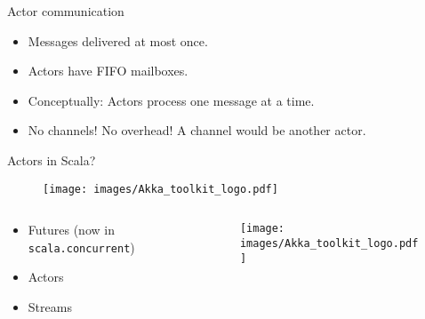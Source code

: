 \documentclass[aspectratio=169]{beamer}
\newcommand{\megatext}[1]{
  \begin{center}
    \Huge
    #1
  \end{center}
}
\begin{document}
\begin{frame}{Actor communication}
  \begin{figure}
  \end{figure}

  \begin{itemize}
  \item Messages delivered at most once.
  \item Actors have FIFO mailboxes.
  \item Conceptually: Actors process one message at a time.
  \item No channels! No overhead! A channel would be another actor.
  \end{itemize}
\end{frame}


\begin{frame}
  \megatext{Actors in Scala?}
\end{frame}


\begin{frame}
  \begin{figure}
    \texttt{[image: images/Akka\_toolkit\_logo.pdf]}
  \end{figure}
\end{frame}


\begin{frame}
  \begin{columns}[c]
    \begin{column}{0.5\textwidth}
      \begin{itemize}
      \item Futures (now in \texttt{scala.concurrent})
      \item Actors
      \item Streams
      \end{itemize}
    \end{column}

    \begin{column}{0.5\textwidth}
      \begin{figure}
        \texttt{[image: images/Akka\_toolkit\_logo.pdf]}
      \end{figure}
    \end{column}
  \end{columns}
\end{frame}
\end{document}
